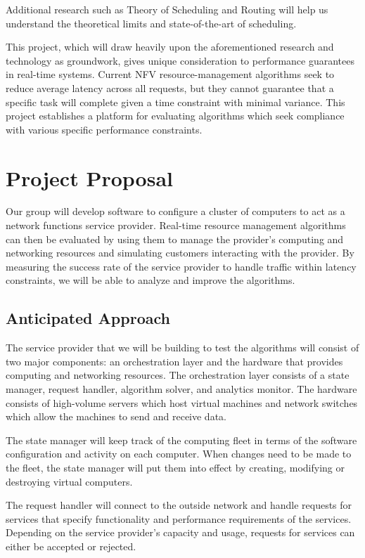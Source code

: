 \documentclass{sig-alternate}
\begin{document}
Additional research such as Theory of Scheduling and Routing \cite{DBLP:conf/fsttcs/BampisKLLS13} will help us understand the theoretical limits and state-of-the-art of scheduling.

This project, which will draw heavily upon the aforementioned research and technology as groundwork, gives unique consideration to performance guarantees in real-time systems. Current NFV resource-management algorithms seek to reduce average latency across all requests, but they cannot guarantee that a specific task will complete given a time constraint with minimal variance. This project establishes a platform for evaluating algorithms which seek compliance with various specific performance constraints.


\section{Project Proposal}
\label{sec:project_proposal}
Our group will develop software to configure a cluster of computers to act as a network functions service provider. Real-time resource management algorithms can then be evaluated by using them to manage the provider's computing and networking resources and simulating customers interacting with the provider. By measuring the success rate of the service provider to handle traffic within latency constraints, we will be able to analyze and improve the algorithms.

\subsection{Anticipated Approach}
\label{subsec:approach}

The service provider that we will be building to test the algorithms will consist of two major components: an orchestration layer and the hardware that provides computing and networking resources. The orchestration layer consists of a state manager, request handler, algorithm solver, and analytics monitor. The hardware consists of high-volume servers which host virtual machines and network switches which allow the machines to send and receive data.

The state manager will keep track of the computing fleet in terms of the software configuration and activity on each computer. When changes need to be made to the fleet, the state manager will put them into effect by creating, modifying or destroying virtual computers.

The request handler will connect to the outside network and handle requests for services that specify functionality and performance requirements of the services. Depending on the service provider's capacity and usage, requests for services can either be accepted or rejected.
\end{document}
